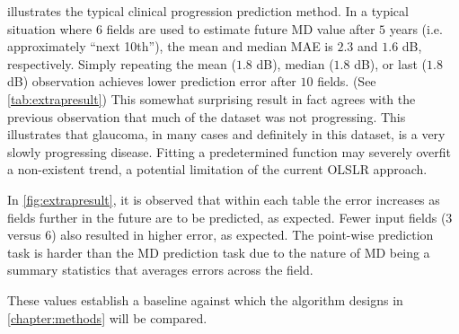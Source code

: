  illustrates the typical clinical progression prediction method. In a typical situation where $6$ fields are used to estimate future MD value after $5$ years (i.e. approximately ``next 10th''), the mean and median \ac{MAE} is $2.3$ and $1.6$ dB, respectively. Simply repeating the mean ($1.8$ dB), median ($1.8$ dB), or last ($1.8$ dB) observation achieves lower prediction error after $10$ fields. (See \cref{tab:extrapresult}) This somewhat surprising result in fact agrees with the previous observation that much of the dataset was not progressing. This illustrates that glaucoma, in many cases and definitely in this dataset, is a very slowly progressing disease. Fitting a predetermined function may severely overfit a non-existent trend, a potential limitation of the current \ac{OLSLR} approach. 

In \cref{fig:extrapresult}, it is observed that within each table the error increases as fields further in the future are to be predicted, as expected. Fewer input fields ($3$ versus $6$) also resulted in higher error, as expected. The point-wise prediction task is harder than the MD prediction task due to the nature of MD being a summary statistics that averages errors across the field. 

These values establish a baseline against which the algorithm designs in \cref{chapter:methods} will be compared. 
